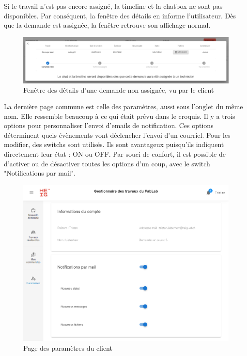 \documentclass[
    iai, %
    eai, %
]{heig-tb}
\begin{document}
\newpage
Si le travail n'est pas encore assigné, la timeline et la chatbox ne sont pas disponibles. Par conséquent, la fenêtre des détails en informe l'utilisateur.
Dès que la demande est assignée, la fenêtre retrouve son affichage normal.

\begin{figure}[h]
  \includegraphics[width=14cm]{ui_jobinfo_client1.PNG}
  \caption{Fenêtre des détails d'une demande non assignée, vu par le client}
\end{figure}

La dernière page commune est celle des paramètres, aussi sous l'onglet du même nom. Elle ressemble beaucoup à ce qui était prévu dans le croquis.
Il y a trois options pour personnaliser l'envoi d'emails de notification. Ces options déterminent quels évènements vont déclencher l'envoi d'un courriel.
Pour les modifier, des switchs sont utilisés. Ils sont avantageux puisqu'ils indiquent directement leur état : ON ou OFF.
Par souci de confort, il est possible de d'activer ou de désactiver toutes les options d'un coup, avec le switch "Notifications par mail".

\begin{figure}[h]
  \includegraphics[width=14cm]{ui_settings_page.PNG}
  \caption{Page des paramètres du client}
\end{figure}
\end{document}
